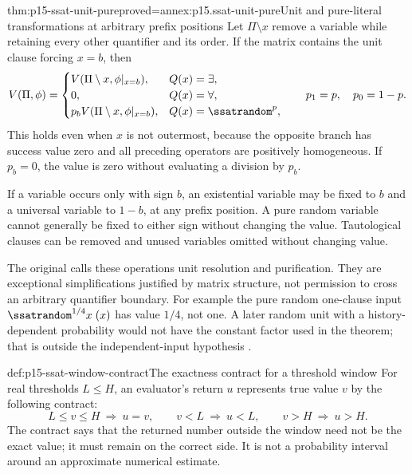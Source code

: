 \begin{hbtheorem}{thm:p15-ssat-unit-pure}{proved=annex:p15.ssat-unit-pure}{Unit and pure-literal transformations at arbitrary prefix positions}
Let \(\Pi\setminus x\) remove a variable while retaining every
other quantifier and its order. If the matrix contains the unit clause
forcing \(x=b\), then
\[
 V(\Pi,\phi)=
 \begin{cases}
 V(\Pi\setminus x,\phi|_{x=b}),&Q(x)=\exists,\\
 0,&Q(x)=\forall,\\
 p_bV(\Pi\setminus x,\phi|_{x=b}),&Q(x)=\ssatrandom^p,
 \end{cases}
 \qquad p_1=p,\quad p_0=1-p.
\]
This holds even when \(x\) is not outermost, because the opposite
branch has success value zero and all preceding operators are positively
homogeneous. If \(p_b=0\), the value is zero without evaluating a
division by \(p_b\).

If a variable occurs only with sign \(b\), an existential variable
may be fixed to \(b\) and a universal variable to \(1-b\), at
any prefix position. A pure random variable cannot generally be fixed
to either sign without changing the value. Tautological clauses can
be removed and unused variables omitted without changing value.
\end{hbtheorem}

The original calls these operations unit resolution and purification.
They are exceptional simplifications justified by matrix structure, not
permission to cross an arbitrary quantifier boundary. For example the
pure random one-clause input \(\ssatrandom^{1/4}x\;(x)\) has
value \(1/4\), not one. A later random unit with a history-dependent
probability would not have the constant factor used in the theorem;
that is outside the independent-input hypothesis
\cite[sec.~2.1, pp.~14--16]{LittmanMajercikPitassi2000SSATAuthor}.

\begin{hbdefinition}{def:p15-ssat-window-contract}{The exactness contract for a threshold window}
For real thresholds \(L\leq H\), an evaluator's return \(u\)
represents true value \(v\) by the following contract:
\[
 L\leq v\leq H\ \Longrightarrow\ u=v,\qquad
 v<L\ \Longrightarrow\ u<L,\qquad
 v>H\ \Longrightarrow\ u>H.
\]
The contract says that the returned number outside the window need not
be the exact value; it must remain on the correct side. It is not a
probability interval around an approximate numerical estimate.
\end{hbdefinition}

